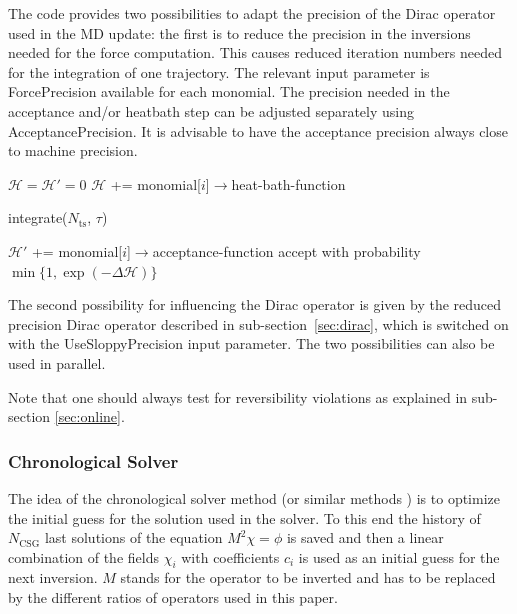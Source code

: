 The code provides two possibilities to adapt the precision of the
Dirac operator used in the MD update: the first is to reduce the
precision in the inversions needed for the force computation. This
causes reduced iteration numbers needed for the integration of one
trajectory. The relevant input parameter is {\ttfamily
  ForcePrecision} available for each monomial. The precision needed in
the acceptance and/or heatbath step can be adjusted separately using
{\ttfamily AcceptancePrecision}. It is advisable to have the
acceptance precision always close to machine precision.


\begin{algorithm}[t]
  \caption{MD update}
  \begin{algorithmic}[1]
    \STATE $\mathcal{H}=\mathcal{H}'=0$
    \STATE $\mathcal{H}$ += monomial[$i$]$\rightarrow$heat-bath-function
    \ENDFOR

    \STATE integrate($N_\mathrm{ts}$, $\tau$)

    \STATE $\mathcal{H}'$ += monomial[$i$]$\rightarrow$acceptance-function
    \ENDFOR
    \STATE accept with probability $\min\{1, \exp(-\Delta\mathcal{H})\}$
  \end{algorithmic}
  \label{alg:mdupdate}
\end{algorithm}


The second possibility for influencing the Dirac operator is given by
the reduced precision Dirac operator described in
sub-section~\ref{sec:dirac}, which is switched on with the {\ttfamily
  UseSloppyPrecision} input parameter. The two possibilities can also
be used in parallel.

Note that one should always test for reversibility violations as
explained in sub-section \ref{sec:online}.

\subsubsection{Chronological Solver}

The idea of the chronological solver method (or similar methods
\cite{Brower:1994er}) is to optimize the initial guess for
the solution used in the solver. To this end the history of
$N_\mathrm{CSG}$ last solutions of the equation $M^2 \chi = \phi$ is
saved and then a linear combination of the fields $\chi_i$ with
coefficients $c_i$ is used as an initial guess for the next
inversion. $M$ stands for the operator to be inverted and has to be
replaced by the different ratios of operators used in this paper.

